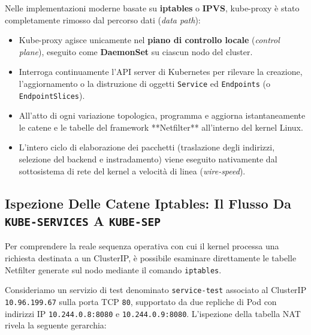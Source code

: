 \documentclass[11pt, a4paper]{article}
\begin{document}

Nelle implementazioni moderne basate su \textbf{iptables} o \textbf{IPVS}, kube-proxy è stato completamente rimosso dal percorso dati (\emph{data path}):
\begin{itemize}[noitemsep]
    \item Kube-proxy agisce unicamente nel \textbf{piano di controllo locale} (\emph{control plane}), eseguito come \textbf{DaemonSet} su ciascun nodo del cluster.
    \item Interroga continuamente l'API server di Kubernetes per rilevare la creazione, l'aggiornamento o la distruzione di oggetti \texttt{Service} ed \texttt{Endpoints} (o \texttt{EndpointSlices}).
    \item All'atto di ogni variazione topologica, programma e aggiorna istantaneamente le catene e le tabelle del framework **Netfilter** all'interno del kernel Linux.
    \item L'intero ciclo di elaborazione dei pacchetti (traslazione degli indirizzi, selezione del backend e instradamento) viene eseguito nativamente dal sottosistema di rete del kernel a velocità di linea (\emph{wire-speed}).
\end{itemize}

\subsection{Ispezione Delle Catene Iptables: Il Flusso Da \texttt{KUBE-SERVICES} A \texttt{KUBE-SEP}}
Per comprendere la reale sequenza operativa con cui il kernel processa una richiesta destinata a un ClusterIP, è possibile esaminare direttamente le tabelle Netfilter generate sul nodo mediante il comando \texttt{iptables}.


Consideriamo un servizio di test denominato \texttt{service-test} associato al ClusterIP \texttt{10.96.199.67} sulla porta TCP \texttt{80}, supportato da due repliche di Pod con indirizzi IP \texttt{10.244.0.8:8080} e \texttt{10.244.0.9:8080}. L'ispezione della tabella NAT rivela la seguente gerarchia:
\end{document}
